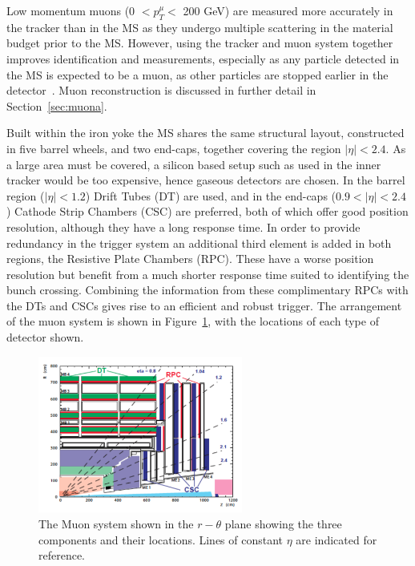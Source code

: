 Low momentum muons (0 $< p^{\mu}_{T} < $ 200 GeV) are measured more accurately in the tracker than in the MS as they undergo multiple scattering in the material budget prior to the MS. However, using the tracker and muon system together improves identification and measurements, especially as any particle detected in the MS is expected to be a muon, as other particles are stopped earlier in the detector~\cite{MuonTDR}. Muon reconstruction is discussed in further detail in Section~\ref{sec:muona}. 

Built within the iron yoke the MS shares the same structural layout, constructed in five barrel wheels, and two end-caps, together covering the region $|\eta| < 2.4$. As a large area must be covered, a silicon based setup such as used in the inner tracker would be too expensive, hence gaseous detectors are chosen. In the barrel region ($|\eta| < 1.2$) Drift Tubes (DT) are used, and in the end-caps ($0.9 < |\eta| < 2.4$) Cathode Strip Chambers (CSC) are preferred, both of which offer good position resolution, although they have a long response time. In order to provide redundancy in the trigger system an additional third element is added in both regions, the Resistive Plate Chambers (RPC). These have a worse position resolution but benefit from a much shorter response time suited to identifying the bunch crossing. Combining the information from these complimentary RPCs with the DTs and CSCs gives rise to an efficient and robust trigger. The arrangement of the muon system is shown in Figure~\ref{fig:MuonSystem}, with the locations of each type of detector shown.

\begin{figure}
\centering
\includegraphics[width=0.6\textwidth]{Figures/Detector/MS}
\caption{The Muon system shown in the $r-\theta$ plane showing the three components and their locations. Lines of constant $\eta$ are indicated for reference.}
\label{fig:MuonSystem}
\end{figure}

